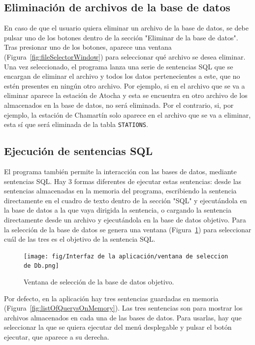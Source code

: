 \subsection{Eliminación de archivos de la base de datos}
\label{PruebasEliminacionArchivos}

En caso de que el usuario quiera eliminar un archivo de la base de datos, se debe pulsar uno de los botones dentro de la sección "Eliminar de la base de datos". Tras presionar uno de los botones, aparece una ventana (Figura~\ref{fig:fileSelectorWindow}) para seleccionar qué archivo se desea eliminar. Una vez seleccionado, el programa lanza una serie de sentencias \acrshort{SQL} que se encargan de eliminar el archivo y todos los datos pertenecientes a este, que no estén presentes en ningún otro archivo. Por ejemplo, si en el archivo que se va a eliminar aparece la estación de Atocha y esta se encuentra en otro archivo de los almacenados en la base de datos, no será eliminada. Por el contrario, si, por ejemplo, la estación de Chamartín solo aparece en el archivo que se va a eliminar, esta sí que será eliminada de la tabla \texttt{STATIONS}.

\subsection{Ejecución de sentencias \acrshort{SQL}}
\label{PruebasEjecucionSQL}

El programa también permite la interacción con las bases de datos, mediante sentencias \acrshort{SQL}. Hay 3 formas diferentes de ejecutar estas sentencias: desde las sentencias almacenadas en la memoria del programa, escribiendo la sentencia directamente en el cuadro de texto dentro de la sección "SQL" y ejecutándola en la base de datos a la que vaya dirigida la sentencia, o cargando la sentencia directamente desde un archivo y ejecutándola en la base de datos objetivo. Para la selección de la base de datos se genera una ventana (Figura~\ref{fig:dataBaseSelector}) para seleccionar cuál de las tres es el objetivo de la sentencia \acrshort{SQL}.

\begin{figure}[H]
    \centering
    \texttt{[image: fig/Interfaz de la aplicación/ventana de seleccion de Db.png]}
    \caption{Ventana de selección de la base de datos objetivo.}
    \label{fig:dataBaseSelector}
\end{figure}

Por defecto, en la aplicación hay tres sentencias guardadas en memoria (Figura~\ref{fig:listOfQuerysOnMemory}). Las tres sentencias son para mostrar los archivos almacenados en cada una de las bases de datos. Para usarlas, hay que seleccionar la que se quiera ejecutar del menú desplegable y pulsar el botón ejecutar, que aparece a su derecha. 

